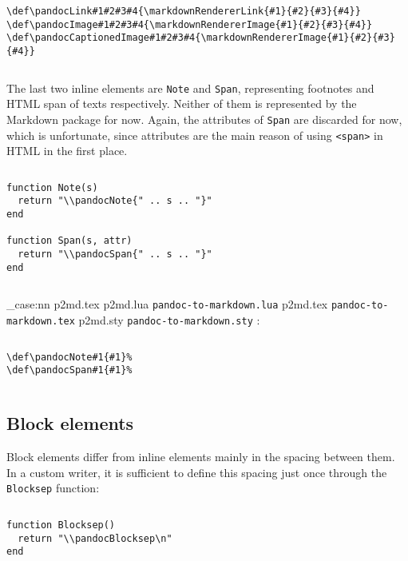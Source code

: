 \documentclass[
  digital,     %
  oneside,     %
  nosansbold,  %
  nocolorbold, %
  lof,         %
  nolot,       %
]{fithesis4}
\newcommand\file[1]
  {
    \str_case:nn
      { #1 }
      {
        { p2md.lua } { \texttt{pandoc\hyp{}to\hyp{}markdown.lua} }
        { p2md.tex } { \texttt{pandoc\hyp{}to\hyp{}markdown.tex} }
        { p2md.sty } { \texttt{pandoc\hyp{}to\hyp{}markdown.sty} }
      }
  }
\begin{document}
$ $

\noindent
\lstset{language=[plain]TeX}
\begin{lstlisting}
\def\pandocLink#1#2#3#4{\markdownRendererLink{#1}{#2}{#3}{#4}}
\def\pandocImage#1#2#3#4{\markdownRendererImage{#1}{#2}{#3}{#4}}
\def\pandocCaptionedImage#1#2#3#4{\markdownRendererImage{#1}{#2}{#3}{#4}}
\end{lstlisting}

$ $

\noindent
The last two inline elements are \texttt{Note} and \texttt{Span}, representing footnotes and HTML span of texts respectively. Neither of them is represented by the Markdown package for now. Again, the attributes of \texttt{Span} are discarded for now, which is unfortunate, since attributes are the main reason of using \texttt{<span>} in HTML in the first place.

$ $

\noindent
\lstset{language=[5.3]Lua}
\begin{lstlisting}
function Note(s)
  return "\\pandocNote{" .. s .. "}"
end

function Span(s, attr)
  return "\\pandocSpan{" .. s .. "}"
end
\end{lstlisting}

$ $

\noindent
\file{p2md.tex}:

$ $

\noindent
\lstset{language=[plain]TeX}
\begin{lstlisting}
\def\pandocNote#1{#1}%
\def\pandocSpan#1{#1}%
\end{lstlisting}

$ $

\subsection{Block elements}

Block elements differ from inline elements mainly in the spacing between them. In a custom writer, it is sufficient to define this spacing just once through the \texttt{Blocksep} function:

$ $

\noindent
\lstset{language=[5.3]Lua}
\begin{lstlisting}
function Blocksep()
  return "\\pandocBlocksep\n"
end
\end{lstlisting}
\end{document}
